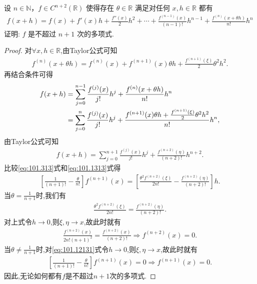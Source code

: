 \documentclass[../../main.tex]{subfiles}%
\begin{document}
\begin{example}
设 \( n \in \mathbb{N} \)，\( f \in C^{n+2}(\mathbb{R}) \) 使得存在 \( \theta \in \mathbb{R} \) 满足对任何 \( x, h \in \mathbb{R} \) 都有
\begin{align*}
f(x + h) = f(x) + f'(x)h + \frac{f''(x)}{2}h^2 + \cdots + \frac{f^{(n-1)}(x)}{(n-1)!}h^{n-1} + \frac{f^{(n)}(x + \theta h)}{n!}h^n
\end{align*}
证明: \( f \) 是不超过 \( n + 1 \) 次的多项式.
\end{example}
\begin{proof}
对$\forall x,h\in \mathbb{R}$,由Taylor公式可知
\begin{align*}
f^{(n)}(x+\theta h) =f^{(n)}(x) +f^{(n+1)}(x) \theta h+\frac{f^{(n+1)}(\xi)}{2}\theta^2 h^2.
\end{align*}
再结合条件可得
\begin{align}
f(x+h) &=\sum_{j=0}^{n-1}\frac{f^{(j)}(x)}{j!}h^j+\frac{f^{(n)}(x+\theta h)}{n!}h^n \notag \\
&=\sum_{j=0}^n\frac{f^{(j)}(x)}{j!}h^j+\frac{f^{(n+1)}(x) \theta h+\frac{f^{(n+1)}(\xi)}{2}\theta^2 h^2}{n!}h^n, \label{eq:101.313}
\end{align}
由Taylor公式可知
\begin{align}
f(x+h) =\sum_{j=0}^{n+1}\frac{f^{(j)}(x)}{j!}h^j+\frac{f^{(n+2)}(\eta)}{(n+2)!}h^{n+2}. \label{eq:101.1313}
\end{align}
比较\eqref{eq:101.313}式和\eqref{eq:101.1313}式得
\begin{align}
\left[ \frac{1}{(n+1)!}-\frac{\theta}{n!} \right] f^{(n+1)}(x) =\left[ \frac{\theta^2 f^{(n+2)}(\xi)}{2n!}-\frac{f^{(n+2)}(\eta)}{(n+2)!} \right] h. \label{eq:101.12131}
\end{align}
当$\theta =\frac{1}{n+1}$时,我们有
\begin{align*}
\frac{\theta^2 f^{(n+2)}(\xi)}{2n!}=\frac{f^{(n+2)}(\eta)}{(n+2)!}.
\end{align*}
对上式令$h\rightarrow 0$,则$\xi,\eta \rightarrow x$,故此时就有
\begin{align*}
\frac{f^{(n+2)}(x)}{2n!(n+1)^2}=\frac{f^{(n+2)}(x)}{(n+2)!}\Rightarrow f^{(n+2)}(x) =0.
\end{align*}
当$\theta \ne \frac{1}{n+1}$时,对\eqref{eq:101.12131}式令$h\rightarrow 0$,则$\xi,\eta \rightarrow x$,故此时就有
\begin{align*}
\left[ \frac{1}{(n+1)!}-\frac{\theta}{n!} \right] f^{(n+1)}(x) =0\Rightarrow f^{(n+1)}(x) =0.
\end{align*}
因此,无论如何都有$f$是不超过$n+1$次的多项式.
\end{proof}
\end{document}
